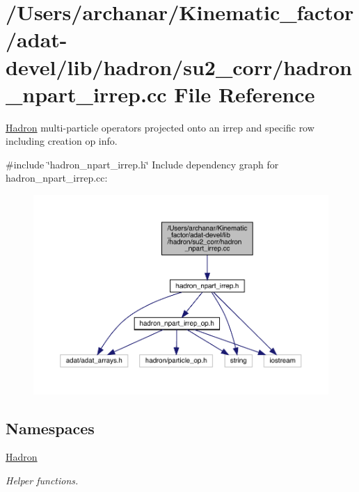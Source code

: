 \hypertarget{adat-devel_2lib_2hadron_2su2__corr_2hadron__npart__irrep_8cc}{}\section{/\+Users/archanar/\+Kinematic\+\_\+factor/adat-\/devel/lib/hadron/su2\+\_\+corr/hadron\+\_\+npart\+\_\+irrep.cc File Reference}
\label{adat-devel_2lib_2hadron_2su2__corr_2hadron__npart__irrep_8cc}


\mbox{\hyperlink{namespaceHadron}{Hadron}} multi-\/particle operators projected onto an irrep and specific row including creation op info.  


{\ttfamily \#include \char`\"{}hadron\+\_\+npart\+\_\+irrep.\+h\char`\"{}}\newline
Include dependency graph for hadron\+\_\+npart\+\_\+irrep.\+cc\+:
\nopagebreak
\begin{figure}[H]
\begin{center}
\leavevmode
\includegraphics[width=350pt]{db/d3a/adat-devel_2lib_2hadron_2su2__corr_2hadron__npart__irrep_8cc__incl}
\end{center}
\end{figure}
\subsection*{Namespaces}
\begin{DoxyCompactItemize}
\item 
 \mbox{\hyperlink{namespaceHadron}{Hadron}}
\begin{DoxyCompactList}\small\item\em Helper functions. \end{DoxyCompactList}\end{DoxyCompactItemize}
